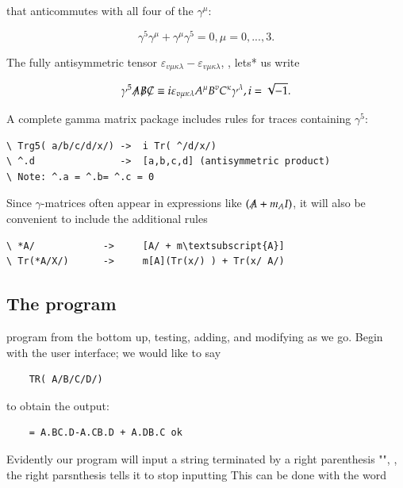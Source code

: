 that anticommutes with all four of the $\gamma^{\mu}$:

\begin{equation}\label{eq:11_09}
    \gamma^{5}\gamma^{\mu} + \gamma^{\mu}\gamma^{5} = 0, \mu = 0,...,3 . \nonumber
\end{equation}

The fully antisymmetric tensor $\varepsilon_{v\mu\kappa\lambda} -\varepsilon_{v\mu\kappa\lambda}$, \etc, lets* us write

\begin{equation}\label{eq:11_10}
\gamma^{5}\tr{A}\tr{B}\tr{C} \equiv i \varepsilon_{v\mu\kappa\lambda} A^{\mu}B^{v}C^{\kappa}\gamma^{\lambda}, i = \sqrt{-1}  .
\end{equation}

A complete gamma matrix package includes rules for traces containing $\gamma^{5}$:

\begin{verbatim}
\ Trg5( a/b/c/d/x/) ->  i Tr( ^/d/x/)
\ ^.d               ->  [a,b,c,d] (antisymmetric product)
\ Note: ^.a = ^.b= ^.c = 0
\end{verbatim}

Since $\gamma$-matrices often appear in expressions like $(\tr{A} + m_{A}I)$, it will also be convenient to include the additional rules

\begin{Verbatim}[commandchars=\\\{\}]
\ *A/            ->     [A/ + m\textsubscript{A}]
\ Tr(*A/X/)      ->     m[A](Tr(x/) ) + Tr(x/ A/)
\end{Verbatim}

\subsection{The program}
 program from the bottom up, testing, adding, and modifying as we go. Begin with the user interface; we would like to say

\begin{lstlisting}
    TR( A/B/C/D/)
\end{lstlisting}

to obtain the output:

\begin{lstlisting}
    = A.BC.D-A.CB.D + A.DB.C ok
\end{lstlisting}

Evidently our program will input a string terminated by a right parenthesis "\bc{)}", \ie, the right parsnthesis tells it to stop inputting This can be done with the word

